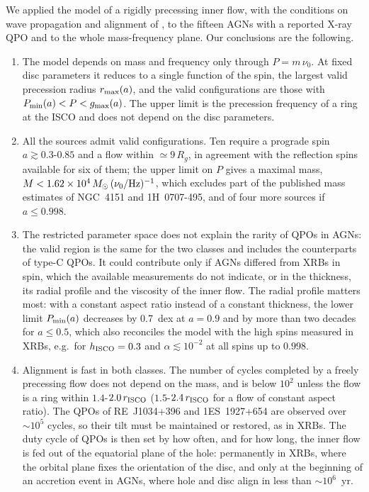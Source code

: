 We applied the model of a rigidly precessing inner flow, with the conditions on wave propagation and alignment of \citet{Motta2017}, to the fifteen AGNs with a reported X-ray QPO and to the whole mass-frequency plane.
Our conclusions are the following.
\begin{enumerate}
    \item The model depends on mass and frequency only through $P=m\,\nu_0$.
    At fixed disc parameters it reduces to a single function of the spin, the largest valid precession radius $r_\textup{max}(a)$, and the valid configurations are those with $P_\textup{min}(a)<P<g_\textup{max}(a)$.
    The upper limit is the precession frequency of a ring at the ISCO and does not depend on the disc parameters.
    \item All the sources admit valid configurations.
    Ten require a prograde spin $a\gtrsim0.3$-$0.85$ and a flow within $\simeq9\,R_g$, in agreement with the reflection spins available for six of them; the upper limit on $P$ gives a maximal mass, $M<1.62\times10^4\,M_\odot\,(\nu_0/\textup{Hz})^{-1}$, which excludes part of the published mass estimates of NGC~4151 and 1H~0707-495, and of four more sources if $a\leq0.998$.
    \item The restricted parameter space does not explain the rarity of QPOs in AGNs: the valid region is the same for the two classes and includes the counterparts of type-C QPOs.
    It could contribute only if AGNs differed from XRBs in spin, which the available measurements do not indicate, or in the thickness, its radial profile and the viscosity of the inner flow.
    The radial profile matters most: with a constant aspect ratio instead of a constant thickness, the lower limit $P_\textup{min}(a)$ decreases by 0.7~dex at $a=0.9$ and by more than two decades for $a\leq0.5$, which also reconciles the model with the high spins measured in XRBs, e.g.\ for $h_\textup{ISCO}=0.3$ and $\alpha\lesssim10^{-2}$ at all spins up to $0.998$.
    \item Alignment is fast in both classes.
    The number of cycles completed by a freely precessing flow does not depend on the mass, and is below $10^2$ unless the flow is a ring within $1.4$-$2.0\,r_\textup{ISCO}$ ($1.5$-$2.4\,r_\textup{ISCO}$ for a flow of constant aspect ratio).
    The QPOs of RE~J1034+396 and 1ES~1927+654 are observed over $\sim10^5$ cycles, so their tilt must be maintained or restored, as in XRBs.
    The duty cycle of QPOs is then set by how often, and for how long, the inner flow is fed out of the equatorial plane of the hole: permanently in XRBs, where the orbital plane fixes the orientation of the disc, and only at the beginning of an accretion event in AGNs, where hole and disc align in less than $\sim10^6$~yr.

\end{enumerate}
